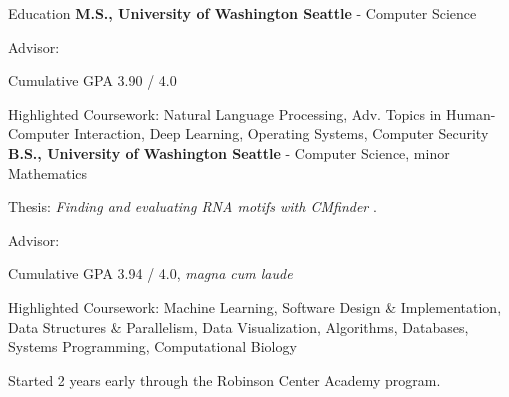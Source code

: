 \begin{rubric}{Education}
	\textbf{M.S., University of Washington Seattle} - Computer Science
    \par Advisor: \pWeldD{}
    \par Cumulative GPA 3.90 / 4.0
    \par Highlighted Coursework: Natural Language Processing, Adv. Topics in Human-Computer Interaction, Deep Learning, Operating Systems, Computer Security
\entry*[2016 -- 2019] %
	\textbf{B.S., University of Washington Seattle} - Computer Science, minor Mathematics
	\par Thesis: \emph{Finding and evaluating RNA motifs with CMfinder} \cite{zhou2019thesis}.
	\par Advisor: \pRuzzoL{}
	\par Cumulative GPA 3.94 / 4.0, \textit{magna cum laude}
	\par Highlighted Coursework: Machine Learning, Software Design \& Implementation, Data Structures \& Parallelism, Data Visualization, Algorithms, Databases, Systems Programming, Computational Biology
	\par Started 2 years early through the Robinson Center Academy program.
\end{rubric}